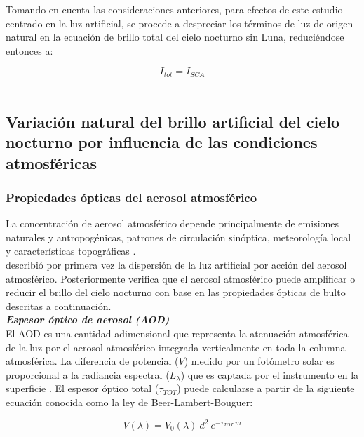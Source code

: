 Tomando en cuenta las consideraciones anteriores, para efectos de este estudio centrado en la luz artificial, se procede a despreciar los términos de luz de origen natural en la ecuación de brillo total del cielo nocturno sin Luna, reduciéndose entonces a:

\begin{equation}
I_{tot} = I_{SCA}
\end{equation}\\


\subsection{Variación natural del brillo artificial del cielo nocturno por influencia de las condiciones atmosféricas}

\subsubsection{Propiedades ópticas del aerosol atmosférico}
\label{subsubsec:propiedadesopticasaerosol}


La concentración de aerosol atmosférico depende principalmente de emisiones naturales y antropogénicas, patrones de circulación sinóptica, meteorología local y características topográficas \citep{Carabali2017}.\\

\cite{Garstang1991} describió por primera vez la dispersión de la luz artificial por acción del aerosol atmosférico. Posteriormente \cite{Kocifaj2007} verifica que el aerosol atmosférico puede amplificar o reducir el brillo del cielo nocturno con base en las propiedades ópticas de bulto descritas a continuación.\\

\textit{\textbf{Espesor óptico de aerosol (AOD)}}\\

El AOD es una cantidad adimensional que representa la atenuación atmosférica de la luz por el aerosol atmosférico integrada verticalmente en toda la columna atmosférica. La diferencia de potencial ($V$) medido por un fotómetro solar es proporcional a la radiancia espectral ($L_{\lambda}$) que es captada por el instrumento en la superficie \citep{Holben1998}. El espesor óptico total ($\tau_{TOT}$) puede calcularse a partir de la siguiente ecuación conocida como la ley de Beer-Lambert-Bouguer:

\begin{equation}
V(\lambda) = V_0(\lambda)\:d^{2} \:e^{-\tau_{TOT}\: m}
\end{equation}

